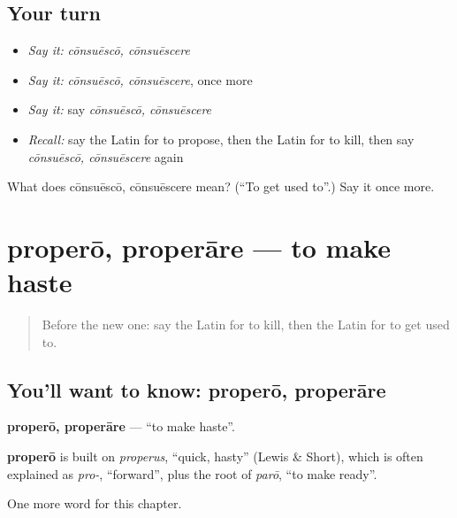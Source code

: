\subsection*{Your turn}
\begin{itemize}
\raggedright
  \item \emph{Say it:} \emph{cōnsuēscō, cōnsuēscere}
  \item \emph{Say it:} \emph{cōnsuēscō, cōnsuēscere}, once more
  \item \emph{Say it:} say \emph{cōnsuēscō, cōnsuēscere}
  \item \emph{Recall:} say the Latin for to propose, then the Latin for to kill, then say \emph{cōnsuēscō, cōnsuēscere} again
\end{itemize}

\begin{tcolorbox}[breakable,colback=teal!4,colframe=teal!35!black,title={Before you move on}]
What does cōnsuēscō, cōnsuēscere mean? (\textquotedblleft{}To get used to\textquotedblright{}.) Say it once more.
\end{tcolorbox}
\section[properō, properāre]{properō, properāre — to make haste}

\label{lesson:LA-C169-propero}



\begin{quote}
Before the new one: say the Latin for to kill, then the Latin for to get used to.
\end{quote}

\subsection*{You'll want to know: properō, properāre}
\textbf{properō, properāre} — \textquotedblleft{}to make haste\textquotedblright{}.

\begin{cousinweb}
\textbf{properō} is built on \emph{properus}, \textquotedblleft{}quick, hasty\textquotedblright{} (Lewis \& Short), which is often explained as \emph{pro-}, \textquotedblleft{}forward\textquotedblright{}, plus the root of \emph{parō}, \textquotedblleft{}to make ready\textquotedblright{}.
\end{cousinweb}

\begin{grammarlens}[title={What you've built}]
One more word for this chapter.
\end{grammarlens}

